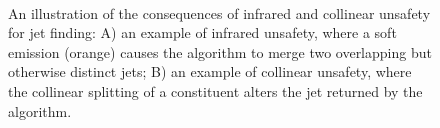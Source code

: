 \begin{figure}[htbp]
  \centering
  \mbox{
     \qquad
     \qquad
  }
  \caption[Infrared and Collinear Unsafety]{An illustration of the consequences of infrared and collinear unsafety for jet finding: A) an example of infrared unsafety, where a soft emission (orange) causes the algorithm to merge two overlapping but otherwise distinct jets; B) an example of collinear unsafety, where the collinear splitting of a constituent alters the jet returned by the algorithm.}
    \label{fig:IRCunsafe}
\end{figure}

